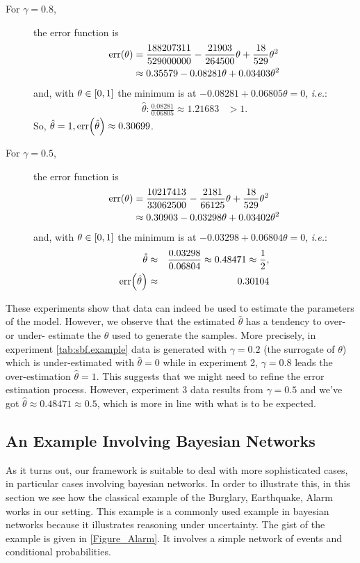 \documentclass{article}
\newcommand{\at}[1]{\ensuremath{\!\del{#1}}}
\newcommand{\err}[1]{\ensuremath{\mathrm{err}\at{#1}}}
\begin{document}
\begin{description}
\item[For $\gamma=0.8$,] the error function is
  \begin{align*}
	\err{\theta} & = \frac{188207311}{529000000} - \frac{21903}{264500} \theta + \frac{18}{529} \theta^{2} \\
				 & \approx 0.35579 - 0.08281 \theta + 0.03403 \theta ^2
  \end{align*}
  and, with $\theta\in\intcc{0, 1}$ the minimum is at
  $-0.08281 + 0.06805 \theta = 0$, \emph{i.e.}:
  \begin{eqnarray*}
	\hat{\theta} : \frac{0.08281}{0.06805} \approx 1.21683& >1.
  \end{eqnarray*}
  So, $\hat{\theta} = 1, \err{\hat{\theta}} \approx  0.30699$.

\item[For $\gamma=0.5$,] the error function is
  \begin{align*}
	\err{\theta} & = \frac{10217413}{33062500} - \frac{2181}{66125} \theta + \frac{18}{529} \theta^{2} \\
				 & \approx 0.30903 - 0.03298 \theta + 0.03402 \theta ^2
  \end{align*}
  and, with $\theta\in\intcc{0, 1}$ the minimum is at
  $-0.03298 + 0.06804 \theta = 0$, \emph{i.e.}:
  \begin{eqnarray*}
	\hat{\theta}        &\approx &
								   \frac{0.03298}{0.06804}
								   \approx 0.48471
								   \approx \frac{1}{2}, \\
	\err{\hat{\theta}}  &\approx &
								   0.30104
  \end{eqnarray*}

\end{description}

These experiments show that data can indeed be used to estimate the
parameters of the model.  However, we observe that the estimated
$\hat{\theta}$ has a tendency to over- or under- estimate the $\theta$
used to generate the samples.  More precisely, in experiment
\ref{tab:sbf.example} data is generated with $\gamma = 0.2$ (the
surrogate of $\theta$) which is under-estimated with
$\hat{\theta} = 0$ while in experiment 2, $\gamma = 0.8$ leads the
over-estimation $\hat{\theta} = 1$.  This suggests that we might need
to refine the error estimation process.  However, experiment 3 data
results from $\gamma = 0.5$ and we've got
$\hat{\theta} \approx 0.48471 \approx 0.5$, which is more in line with
what is to be expected.
%
%
%
\subsection{An Example Involving Bayesian
  Networks}\label{subsec:example.bayesian.networks}
%
%
%
As it turns out, our framework is suitable to deal with more
sophisticated cases, in particular cases involving bayesian networks.
In order to illustrate this, in this section we see how the classical
example of the Burglary, Earthquake, Alarm \cite{Judea88} works in our
setting.  This example is a commonly used example in bayesian networks
because it illustrates reasoning under uncertainty.  The gist of the
example is given in \cref{Figure_Alarm}.  It involves a simple network
of events and conditional probabilities.
\end{document}
